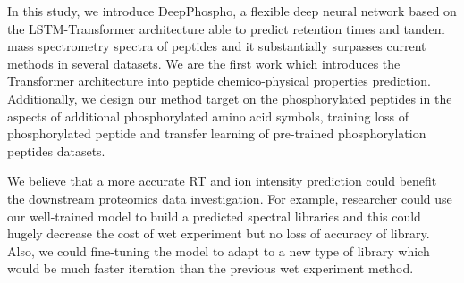 In this study, we introduce DeepPhospho, a flexible deep neural network based on the LSTM-Transformer architecture able to predict retention times and tandem mass spectrometry spectra of peptides and it substantially surpasses current methods in several datasets. We are the first work which introduces the Transformer architecture into peptide chemico-physical properties prediction. Additionally, we design our method target on the phosphorylated peptides in the aspects of additional phosphorylated amino acid symbols, training loss of phosphorylated peptide and transfer learning of pre-trained phosphorylation peptides datasets.

We believe that a more accurate RT and ion intensity prediction could benefit the downstream proteomics data investigation. For example, researcher could use our well-trained model to build 
a predicted spectral libraries and this could hugely decrease the cost of wet experiment but no loss of accuracy of library. Also, we could fine-tuning the model to adapt to a new type of library which would be much faster iteration than the previous wet experiment method. 
